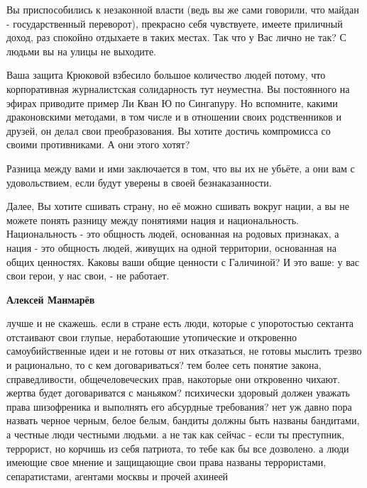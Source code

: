 \begin{itemize}
Вы приспособились к незаконной власти (ведь вы же сами говорили, что майдан -
государственный переворот), прекрасно себя чувствуете, имеете приличный доход,
раз спокойно отдыхаете в таких местах.  Так что у Вас лично не так? С людьми вы
на улицы не выходите. 

Ваша защита Крюковой взбесило большое количество людей потому, что
корпоративная журналистская солидарность тут неуместна. Вы постоянного на
эфирах приводите пример Ли Кван Ю по Сингапуру. Но вспомните, какими
драконовскими методами, в том числе и в отношении своих родственников и друзей,
он делал свои преобразования. Вы хотите достичь компромисса со своими
противниками. А они этого хотят? 

Разница между вами и ими заключается в том, что вы их не убьёте, а они вам с
удовольствием, если будут уверены в своей безнаказанности. 

Далее, Вы хотите сшивать страну, но её можно сшивать вокруг нации, а вы не
можете понять разницу между понятиями нация и национальность. Национальность -
это общность людей, основанная на родовых признаках, а нация - это общность
людей, живущих на одной территории, основанная на общих ценностях. Каковы ваши
общие ценности с Галичиной? И это ваше: у вас свои герои, у нас свои, - не
работает.

\begin{itemize}

 
\textbf{Алексей Манмарёв} 

лучше и не скажешь. если в стране есть люди, которые
с упоротостью сектанта отстаивают свои глупые, неработаюшие утопические и
откровенно самоубийственные идеи и не готовы от них отказаться, не готовы
мыслить трезво и рационально, то с кем договариваться? тем более сеть понятие
закона, справедливости, общечеловеческих прав, накоторые они откровенно чихают.
жертва будет договариватся с маньяком? психически здоровый должен уважать права
шизофреника и выполнять его абсурдные требования? нет уж давно пора назвать
черное черным, белое белым, бандиты должны быть названы бандитами, а честные
люди честными людьми. а не так как сейчас - если ты преступник, террорист, но
корчишь из себя патриота, то тебе как бы все дозволено. а люди имеющие свое
мнение и защищающие свои права названы террористами, сепаратистами, агентами
москвы и прочей ахинеей


\end{itemize}
\end{itemize}
